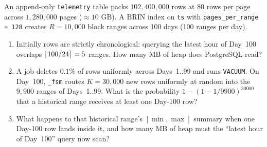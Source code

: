 \begin{exercise}
\label{exer:ch03-brin-poisoning}
An append-only \texttt{telemetry} table packs $102{,}400{,}000$ rows at $80$ rows per page across $1{,}280{,}000$ pages ($\approx 10\text{ GB}$). A BRIN index on \texttt{ts} with \texttt{pages\_per\_range = 128} creates $R = 10{,}000$ block ranges across 100 days (100 ranges per day).
\begin{enumerate}
  \item Initially rows are strictly chronological: querying the latest hour of Day~100 overlaps $\lceil100 / 24\rceil = 5$ ranges. How many MB of heap does PostgreSQL read?
  \item A job deletes $0.1\%$ of rows uniformly across Days~1..99 and runs \texttt{VACUUM}. On Day~100, \texttt{\_fsm} routes $K = 30{,}000$ new rows uniformly at random into the $9{,}900$ ranges of Days~1..99. What is the probability $1 - (1 - 1/9900)^{30000}$ that a historical range receives at least one Day-100 row?
  \item What happens to that historical range's $[\min, \max]$ summary when one Day-100 row lands inside it, and how many MB of heap must the ``latest hour of Day~100'' query now scan?
\end{enumerate}
\end{exercise}

\chapterline
